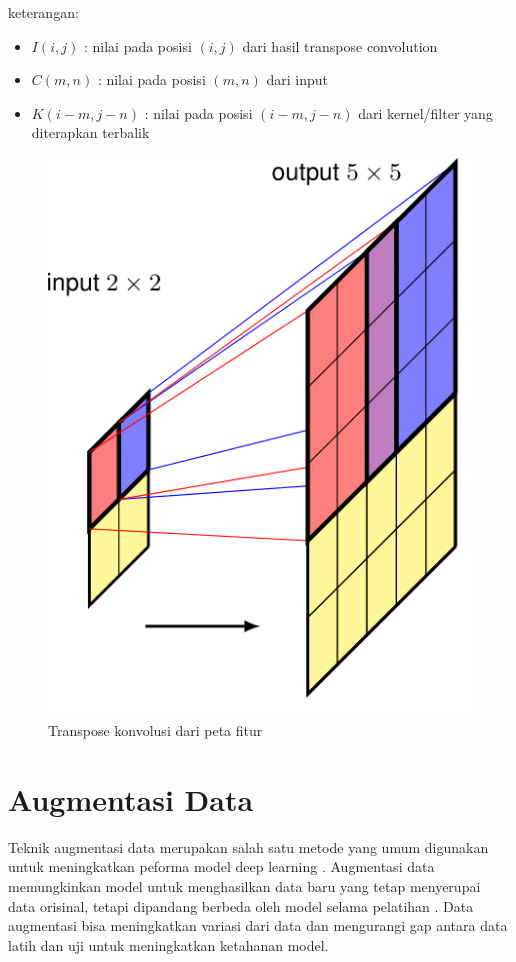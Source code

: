 \noindent
keterangan:
\begin{itemize}
	\item $I(i,j)$ : nilai pada posisi $(i,j)$ dari hasil transpose convolution
	\item $C(m,n)$ : nilai pada posisi $(m,n)$ dari input
	\item $K(i-m, j-n)$ : nilai pada posisi $(i-m, j-n)$ dari kernel/filter yang diterapkan terbalik
\end{itemize}


\begin{figure}[H]
	\centering
	\includegraphics[scale=0.5]{gambar/deconv.png}
	\caption{Transpose konvolusi dari peta fitur \cite{bishop_deep_2024}}
	\label{fig:deconv}
\end{figure}


\section{Augmentasi Data}

\noindent Teknik augmentasi data merupakan salah satu metode yang umum digunakan untuk meningkatkan peforma model deep learning \cite{minaee_image_2020}. Augmentasi data memungkinkan model untuk menghasilkan data baru yang tetap menyerupai data orisinal, tetapi dipandang berbeda oleh model selama pelatihan \cite{huang_fully_2022}. Data augmentasi bisa meningkatkan variasi dari data dan mengurangi gap antara data latih dan uji untuk meningkatkan ketahanan model.

